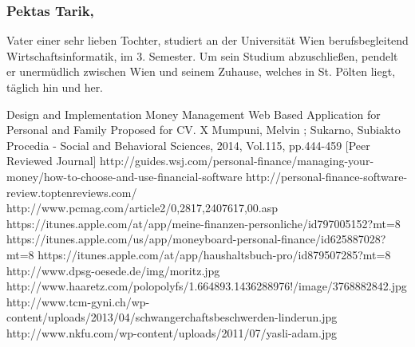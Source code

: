 \documentclass[runningheads,a4paper]{llncs}
\begin{document}
\subsubsection{Pektas Tarik,}
Vater einer sehr lieben Tochter, studiert an der Universität Wien berufsbegleitend Wirtschaftsinformatik, im 3. Semester. Um sein Studium abzuschließen, pendelt er unermüdlich zwischen Wien und seinem Zuhause, welches in St. Pölten liegt, täglich hin und her.


\begin{thebibliography}{1}
 Design and Implementation Money Management Web Based Application for Personal and Family Proposed for CV. X Mumpuni, Melvin ; Sukarno, Subiakto Procedia - Social and Behavioral Sciences, 2014, Vol.115, pp.444-459 [Peer Reviewed Journal] 
 http://guides.wsj.com/personal-finance/managing-your-money/how-to-choose-and-use-financial-software
 http://personal-finance-software-review.toptenreviews.com/
 http://www.pcmag.com/article2/0,2817,2407617,00.asp
 https://itunes.apple.com/at/app/meine-finanzen-personliche/id797005152?mt=8
https://itunes.apple.com/us/app/moneyboard-personal-finance/id625887028?mt=8
 https://itunes.apple.com/at/app/haushaltsbuch-pro/id879507285?mt=8
 http://www.dpsg-oesede.de/img/moritz.jpg
 http://www.haaretz.com/polopolyfs/1.664893.1436288976!/image/3768882842.jpg
 http://www.tcm-gyni.ch/wp-content/uploads/2013/04/schwangerchaftsbeschwerden-linderun.jpg
 http://www.nkfu.com/wp-content/uploads/2011/07/yasli-adam.jpg

\end{thebibliography}
\end{document}
